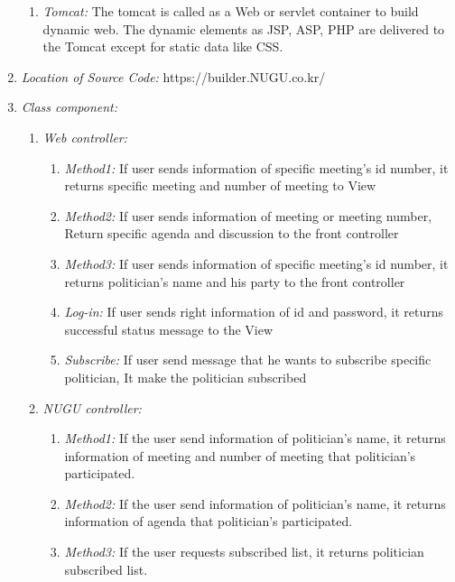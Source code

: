 \documentclass[conference]{IEEEtran}
\begin{document}
\begin{enumerate}
\begin{enumerate}
\item \textit {Tomcat: }The tomcat is called as a Web or servlet container to build dynamic web. The dynamic elements as JSP, ASP, PHP are delivered to the Tomcat except for static data like CSS.\
   \end{enumerate}

  \item \textit{Location of Source Code: } https://builder.NUGU.co.kr/\\

  \item \textit{Class component: }
  \begin{enumerate}
\item \textit {Web controller: }  \
\begin{enumerate}
\item \textit {Method1: }  If user sends information of specific meeting’s id number, it returns specific meeting and number of meeting to View
\item \textit {Method2: } If user sends information of meeting or meeting number, Return specific agenda and discussion to the front controller
\item \textit {Method3: } If user sends information of specific meeting’s id number, it returns politician’s name and his party to the front controller
\item \textit { Log-in:} If user sends right information of id and password, it returns successful status message to the View
\item \textit { Subscribe:} If user send message that he wants to subscribe specific politician, It make the politician subscribed
\\
\end{enumerate}

\item \textit {NUGU controller: }  \

\begin{enumerate}
\item \textit {Method1: }   If the user send information of politician’s name, it returns information of meeting and number of meeting that politician’s participated.
\item \textit {Method2: } If the user send information of politician’s name, it returns information of agenda that politician’s participated.
\item \textit {Method3: } If the user requests subscribed list, it returns politician subscribed list.
\\
 \end{enumerate}
 

\end{enumerate}
\end{enumerate}
\end{document}
